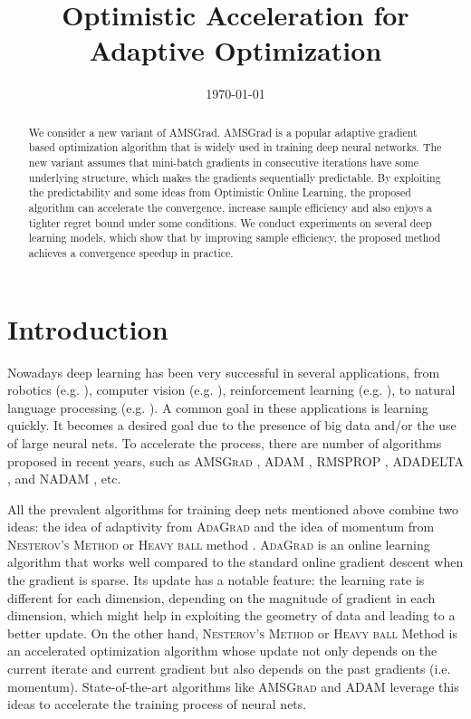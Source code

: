 \documentclass[11pt]{article}
\theoremstyle{k}
\begin{document}
\title{Optimistic Acceleration for Adaptive Optimization}
\date{\today}

\maketitle


\begin{abstract}
We consider a new variant of AMSGrad. 
AMSGrad \cite{RKK18} is a popular adaptive gradient based optimization algorithm that is widely used in training deep neural networks. 
The new variant assumes that mini-batch gradients in consecutive iterations have some underlying structure, which makes the gradients sequentially predictable. 
By exploiting the predictability and some ideas from Optimistic Online Learning, the proposed algorithm can accelerate the convergence, increase sample efficiency and also enjoys a tighter regret bound under some conditions. We conduct experiments on several deep learning models, which show that by improving sample efficiency, the proposed method achieves a convergence speedup in practice.
\end{abstract}

\section{Introduction}

Nowadays deep learning has been very successful in several applications, from 
robotics (e.g. \cite{LFDA17}), 
computer vision (e.g. \cite{Rnet16,goodfellow2014generative}),
reinforcement learning (e.g. \cite{Atari13}),
to 
natural language processing (e.g. \cite{GMH13}).
A common goal in these applications is learning quickly.
It becomes a desired goal 
due to the presence of big data and/or the use of large neural nets.
To accelerate the process, there are number of algorithms proposed in recent years, such as 
\textsc{AMSGrad} \cite{RKK18}, 
\textsc{ADAM} \cite{KB15}, \textsc{RMSPROP} \cite{TH12}, \textsc{ADADELTA} \cite{Z12}, and \textsc{NADAM} \cite{D16}, etc.

All the prevalent algorithms for training deep nets mentioned above combine two ideas: the idea of adaptivity from \textsc{AdaGrad} \cite{DHS11,MS10} and the idea of momentum from \textsc{Nesterov's  Method} \cite{N04} or \textsc{Heavy ball} method \cite{P64}.
\textsc{AdaGrad} is an online learning algorithm that works well compared to the standard online gradient descent when the gradient is sparse.
Its update has a notable feature: the learning rate is different for each dimension, depending on the magnitude of gradient in each dimension, which might help in exploiting the geometry of data and leading to a better update. 
On the other hand,
\textsc{Nesterov's Method} or \textsc{Heavy ball} Method \cite{P64} is an accelerated optimization algorithm whose update not only depends on the current iterate and current gradient but also depends on the past gradients (i.e. momentum). State-of-the-art algorithms like \textsc{AMSGrad} \cite{RKK18} and \textsc{ADAM} \cite{KB15} leverage this ideas to accelerate the training process of neural nets.
\end{document}

